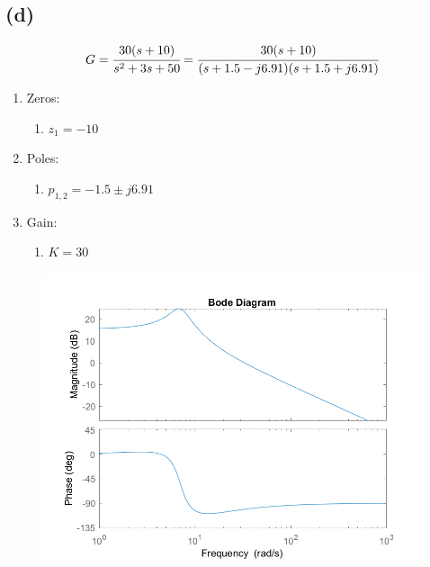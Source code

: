 \documentclass[letter]{article}
\numberwithin{equation}{section}
\begin{document}
\subsection{(d)}
\[
	G = \cfrac{
		30 (s + 10)
	}{
		s^2 + 3s + 50
	}
	= \cfrac{
		30 (s+10)
	}{
		(s + 1.5 - j6.91) (s + 1.5 + j6.91)
	}
\]
\begin{enumerate}
	\item Zeros:
	\begin{enumerate}
		\item $z_1 = -10$
	\end{enumerate}
	\item Poles:
	\begin{enumerate}
		\item $p_{1,2} = -1.5 \pm j 6.91$
	\end{enumerate}
	\item Gain:
	\begin{enumerate}
		\item $K = 30$
	\end{enumerate}
\end{enumerate}

\begin{figure}[h!]
	\centering
	\includegraphics[width=\textwidth]{figs/pblm2d.png}
\end{figure}



\newpage
\end{document}
